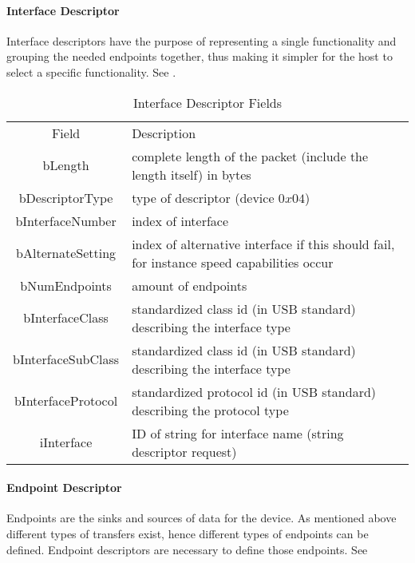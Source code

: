 \paragraph{Interface Descriptor}
Interface descriptors have the purpose of representing a single functionality and grouping the needed endpoints together, thus making 
it simpler for the host to select a specific functionality. See .%

\begin{table}[h!]
\begin{tabular}{c|p{9cm}}
Field & Description \\
bLength &  complete length of the packet (include the length itself) in bytes \\
bDescriptorType &  type of descriptor (device $0x04$) \\
bInterfaceNumber & index of interface \\
bAlternateSetting & index of alternative interface if this should fail, for instance speed capabilities occur \\
bNumEndpoints & amount of endpoints \\
bInterfaceClass & standardized class id (in USB standard) describing the interface type \\
bInterfaceSubClass & standardized class id (in USB standard) describing the interface type \\
bInterfaceProtocol & standardized protocol id (in USB standard) describing the protocol type \\
iInterface & ID of string for interface name (string descriptor request) \\
\end{tabular}
 \caption[Table]{Interface Descriptor Fields}
 \label{tab:interfacedescriptor}
\end{table}

\paragraph{Endpoint Descriptor} 

Endpoints are the sinks and sources of data for the device. As mentioned above different types of transfers exist, hence different types of 
endpoints can be defined. Endpoint descriptors are necessary to define those endpoints. See %


